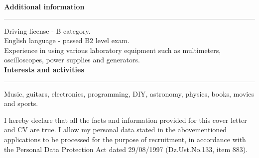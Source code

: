 \documentclass{article}
\newcommand{\header}[1]
{
	\textbf{\large #1}
	\vspace{0.005\textheight}
	\hrule
	\vspace{0.005\textheight}
}
\begin{document}

\header{Additional information}
Driving license - B category.\\
English language - passed B2 level exam.\\
Experience in using various laboratory equipment such as multimeters, oscilloscopes, power supplies and generators.\\
\header{Interests and activities}
Music, guitars, electronics, programming, DIY, astronomy, physics, books, movies and sports.
\vspace{0.05\textheight}
\noindent\newline
\scriptsize
\begin{minipage}{\textwidth}
	I hereby declare that all the facts and information provided for this cover letter and CV are true. I allow my personal data stated in the abovementioned applications to be processed for the purpose of recruitment, in accordance with the Personal Data Protection Act dated 29/08/1997 (Dz.Ust.No.133, item 883).
\end{minipage}
\end{document}
